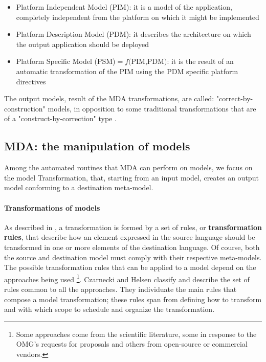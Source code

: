 \begin{itemize}
 \item Platform Independent Model (PIM): it is a model of the application, completely independent from the platform on which it might be implemented
 \item Platform Description Model (PDM): it describes the architecture on which the output application should be deployed
 \item Platform Specific Model (PSM)$=f($PIM,PDM$)$: it is the result of an automatic transformation of the PIM using the PDM specific platform directives  
\end{itemize}

The output models, result of the MDA transformations, are called: "correct-by-construction" models, in opposition to some traditional transformations that are of a "construct-by-correction" type \cite{Marrone}.   


\subsection{MDA: the manipulation of models}
\label{MDAModelManipulation}
Among the automated routines that MDA can perform on models, we focus on the model Transformation, that, starting from an input model, creates an output model conforming to a destination meta-model. 

\paragraph{Transformations of models}
As described in \cite{Papa11}, a transformation is formed by a set of rules, or \textbf{transformation rules}, that describe how an element expressed in the source language should be transformed in one or more elements of the destination language.
Of course, both the source and destination model must comply with their respective meta-models.
The possible transformation rules that can be applied to a model depend on the approaches being used \footnote{Some approaches come from the scientific literature, some in response to the OMG's requests for proposals and others from open-source or commercial vendors.}. Czarnecki and Helsen \cite{Czarnecki03classificationof} classify and describe the set of rules common to all the approaches.
They individuate the main rules that compose a model transformation; these rules span from defining how to transform and with which scope to schedule and organize the transformation.

